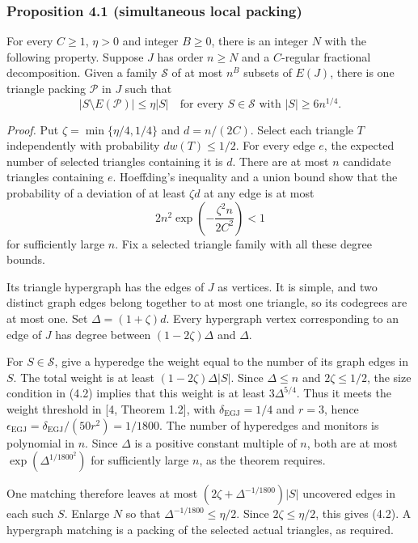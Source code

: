 \documentclass[english,11pt,a4paper]{article}
\providecommand{\mathscr}{\mathcal}
\begin{document}
\subsubsection{Proposition 4.1 (simultaneous local packing)}\label{proposition-4.1-simultaneous-local-packing}

For every \(C\ge1\), \(\eta>0\) and integer \(B\ge0\), there is an integer \(N\) with the following property. Suppose \(J\) has order \(n\ge N\) and a \(C\)-regular fractional decomposition. Given a family \(\mathscr S\) of at most \(n^B\) subsets of \(E(J)\), there is one triangle packing \(\mathcal P\) in \(J\) such that \[|S\setminus E(\mathcal P)|\le\eta|S|
\quad\text{for every }S\in\mathscr S\text{ with }|S|\ge6n^{1/4}.
\tag{4.2}\]

\emph{Proof.} Put \(\zeta=\min\{\eta/4,1/4\}\) and \(d=n/(2C)\). Select each triangle \(T\) independently with probability \(dw(T)\le1/2\). For every edge \(e\), the expected number of selected triangles containing it is \(d\). There are at most \(n\) candidate triangles containing \(e\). Hoeffding's inequality and a union bound show that the probability of a deviation of at least \(\zeta d\) at any edge is at most \[2n^2\exp\left(-\frac{\zeta^2 n}{2C^2}\right)<1
\tag{4.3}\] for sufficiently large \(n\). Fix a selected triangle family with all these degree bounds.

Its triangle hypergraph has the edges of \(J\) as vertices. It is simple, and two distinct graph edges belong together to at most one triangle, so its codegrees are at most one. Set \(\Delta=(1+\zeta)d\). Every hypergraph vertex corresponding to an edge of \(J\) has degree between \((1-2\zeta)\Delta\) and \(\Delta\).

For \(S\in\mathscr S\), give a hyperedge the weight equal to the number of its graph edges in \(S\). The total weight is at least \((1-2\zeta)\Delta|S|\). Since \(\Delta\le n\) and \(2\zeta\le1/2\), the size condition in (4.2) implies that this weight is at least \(3\Delta^{5/4}\). Thus it meets the weight threshold in {[}4, Theorem 1.2{]}, with \(\delta_{\mathrm{EGJ}}=1/4\) and \(r=3\), hence \(\epsilon_{\mathrm{EGJ}}=\delta_{\mathrm{EGJ}}/(50r^2)=1/1800\). The number of hyperedges and monitors is polynomial in \(n\). Since \(\Delta\) is a positive constant multiple of \(n\), both are at most \(\exp(\Delta^{1/1800^2})\) for sufficiently large \(n\), as the theorem requires.

One matching therefore leaves at most \((2\zeta+\Delta^{-1/1800})|S|\) uncovered edges in each such \(S\). Enlarge \(N\) so that \(\Delta^{-1/1800}\le\eta/2\). Since \(2\zeta\le\eta/2\), this gives (4.2). A hypergraph matching is a packing of the selected actual triangles, as required.
\end{document}
